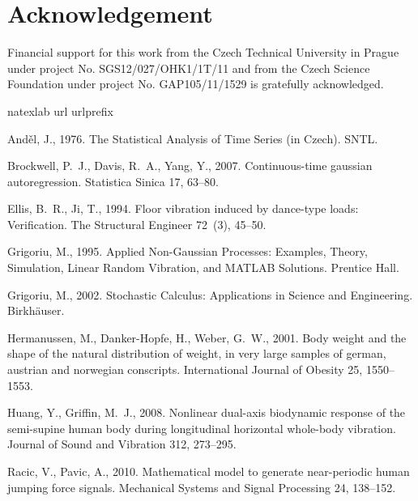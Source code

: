 \documentclass[preprint,12pt,authoryear]{elsarticle}
\begin{document}
\section*{Acknowledgement}
Financial support for this work from the Czech Technical University in Prague
under project No. SGS12/027/OHK1/1T/11 and from the Czech Science Foundation under project No. GAP105/11/1529 is gratefully acknowledged.





\begin{thebibliography}{11}
	\expandafter\ifx\csname natexlab\endcsname\relax\def\natexlab#1{#1}\fi
	\expandafter\ifx\csname url\endcsname\relax
	\def\url#1{\texttt{#1}}\fi
	\expandafter\ifx\csname urlprefix\endcsname\relax\def\urlprefix{URL }\fi
	
	And\v{e}l, J., 1976. The Statistical Analysis of Time Series (in Czech). SNTL.
	
	Brockwell, P.~J., Davis, R.~A., Yang, Y., 2007. Continuous-time gaussian
	autoregression. Statistica Sinica 17, 63--80.
	
	Ellis, B.~R., Ji, T., 1994. Floor vibration induced by dance-type loads:
	Verification. The Structural Engineer 72~(3), 45--50.
	
	Grigoriu, M., 1995. Applied Non-Gaussian Processes: Examples, Theory,
	Simulation, Linear Random Vibration, and MATLAB Solutions. Prentice Hall.
	
	Grigoriu, M., 2002. Stochastic Calculus: Applications in Science and
	Engineering. Birkh\"{a}user.
	
	Hermanussen, M., Danker-Hopfe, H., Weber, G.~W., 2001. Body weight and the
	shape of the natural distribution of weight, in very large samples of german,
	austrian and norwegian conscripts. International Journal of Obesity 25,
	1550--1553.
	
	Huang, Y., Griffin, M.~J., 2008. Nonlinear dual-axis biodynamic response of the
	semi-supine human body during longitudinal horizontal whole-body vibration.
	Journal of Sound and Vibration 312, 273--295.
	
	Racic, V., Pavic, A., 2010. Mathematical model to generate near-periodic human
	jumping force signals. Mechanical Systems and Signal Processing 24, 138--152.
	

\end{thebibliography}
\end{document}

